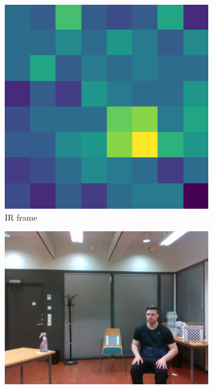 \begin{figure}
    \centering
    \begin{subfigure}[t]{0.3\textwidth}
        \includegraphics[width=\textwidth]{fig/5/ir_t_24.0.png}
        \caption{IR frame}
    \end{subfigure}
    \hfill
    \begin{subfigure}[t]{0.3\textwidth}
        \includegraphics[width=\textwidth]{fig/5/rgb_t_24.0.png}

\end{subfigure}
\end{figure}
